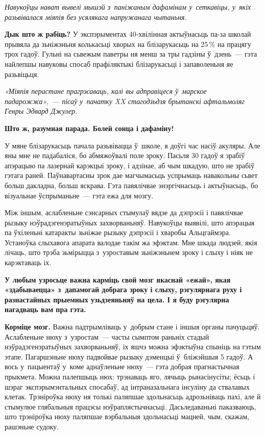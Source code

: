 \emph{Навукоўцы нават вывелі мышэй з~паніжаным дафамінам у~сеткавіцы, у~якіх разьвівалася міяпія без усялякага напружанага чытаньня.}

\textbf{Дык што ж рабіць?} У экспэрыментах 40-хвілінная актыўнасьць па-за школай прывяла да зьніжэньня колькасьці хворых на блізарукасьць на 25\,\% на працягу трох гадоў. Гульні на сьвежым паветры ня менш за тры гадзіны ў~дзень~--- гэта найлепшы навуковы спосаб прафіляктыкі блізарукасьці і запаволеньня яе разьвіцьця. 

\emph{«Міяпія перастане прагрэсаваць, калі вы адправіцеся ў~марское падарожжа»,~--- пісаў у~пачатку XX стагодзьдзя брытанскі афтальмоляг Генры Эдвард Джулер.}

\textbf{Што ж, разумная парада. Болей сонца і дафаміну!}

У мяне блізарукасьць пачала разьвівацца ў~школе, я доўгі час насіў акуляры. Але яны мне не падабаліся, бо абмяжоўвалі поле зроку. Пасьля 30 гадоў я зрабіў апэрацыю па лазернай карэкцыі зроку, і адзінае, аб чым шкадую, што не зрабіў гэтага раней. Паўнавартасны зрок дае магчымасьць успрымаць навакольны сьвет больш дакладна, больш яскрава. Гэта павялічвае энэргічнасьць і актыўнасьць, бо візуальнае ўспрыманьне~--- гэта ежа для мозгу.

Між іншым, аслабленьне сэнсарных стымулаў вядзе да дэпрэсіі і павялічвае рызыку нэўрадэгенэратыўных захворваньняў. Навукоўцы выявілі, што апэрацыя па ўхіленьні катаракты зьніжае рызыку дэпрэсіі і хваробы Альцгаймэра. Устаноўка слыхавога апарата валодае такім жа эфэктам. Мне шкада людзей, якія лічаць, што трэба зьмірыцца з~узроставым зьніжэньнем зроку і слыху і ніяк не карэктаваць іх. 

\textbf{У любым узросьце важна карміць свой мозг якаснай «ежай», якая «здабываецца» з~дапамогай добрага зроку і слыху, рэгулярнага руху і разнастайных прыемных узьдзеяньняў на цела. І я буду рэгулярна нагадваць вам пра гэта.}

\textbf{Корміце мозг.} Важна падтрымліваць у~добрым стане і іншыя органы пачуцьцяў. Аслабленьне нюху з~узростам~--- часты сымптом раньніх стадый нэўрадэгенэратыўных захворваньняў, іх яшчэ можна эфэктыўна спыніць на гэтым этапе. Пагаршэньне нюху падвойвае рызыку дэменцыі ў~бліжэйшыя 5 гадоў. А вось у~пацыентаў у~коме аднаўленьне нюху~--- гэта добрая прагнастычная прыкмета. Можна палепшыць нюх: трэнаваць яго, лячыць рынасінусіты; ёсьць і шэраг экспэрымэнтальных спосабаў, ад інтраназальнага інсуліну да ствалавых клетак. Трэніроўка нюху ня толькі паляпшае здольнасьць адрозьніваць пахі, але й стымулюе глябальныя працэсы нэўраплястычнасьці. Дасьледаваньні паказваюць, што трэніроўка нюху паляпшае вэрбальныя здольнасьці мацней, чым, скажам, рашэньне судоку.

